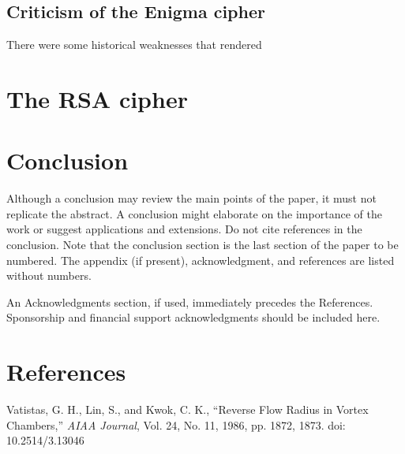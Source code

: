 \documentclass{AIAA}
\begin{document}
\subsection{Criticism of the Enigma cipher}

There were some historical weaknesses that rendered

\section{The RSA cipher}

\section{Conclusion}
Although a conclusion may review the main points of the paper, it must not replicate the abstract. A conclusion might elaborate on the importance of the work or suggest applications and extensions. Do not cite references in the conclusion. Note that the conclusion section is the last section of the paper to be numbered. The appendix (if present), acknowledgment, and references are listed without numbers.

An Acknowledgments section, if used, immediately precedes the References. Sponsorship and financial support acknowledgments should be included here.

\section*{References}

\begin{thebibliography}{}
 Vatistas, G. H., Lin, S., and Kwok, C. K., ``Reverse Flow Radius in Vortex Chambers,'' \textit{AIAA Journal}, Vol. 24, No. 11, 1986, pp. 1872, 1873. doi: 10.2514/3.13046

\end{thebibliography}
\end{document}
